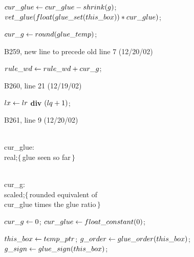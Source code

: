 {\ninepoint\noindent
\qquad{} $\\{cur\_glue}\gets\\{cur\_glue}-\\{shrink}(g)$;
 $\\{vet\_glue}(\\{float}(\\{glue\_set}(\\{this\_box}))*\\{cur\_glue})$;\par
\noindent\qquad\qquad$\\{cur\_g}\gets\\{round}(\\{glue\_temp})$;

\bugonpage B259, new line to precede old line 7 (12/20/02)

\ninepoint\noindent
\quad$\\{rule\_wd}\gets\\{rule\_wd}+\\{cur\_g}$;

\bugonpage B260, line 21 (12/19/02)

\ninepoint\noindent
{} $\\{lx}\gets\\{lr}$ {\bf div} $(\\{lq}+1)$;

\bugonpage B261, line 9 (12/20/02)

\ninepoint\noindent
\qquad\\{cur\_glue}: \\{real};\quad$\{\,$glue seen so far$\,\}$\par\noindent
\qquad\\{cur\_g}: \\{scaled};\quad$\{\,$rounded
  equivalent of \\{cur\_glue} times the glue ratio$\,\}$\par\noindent
{} $\\{cur\_g}\gets0$;
  $\\{cur\_glue}\gets\\{float\_constant}(0)$;\par\noindent
\quad$\\{this\_box}\gets\\{temp\_ptr}$;
 $\\{g\_order}\gets\\{glue\_order}(\\{this\_box})$;
 $\\{g\_sign}\gets\\{glue\_sign}(\\{this\_box})$;

}
